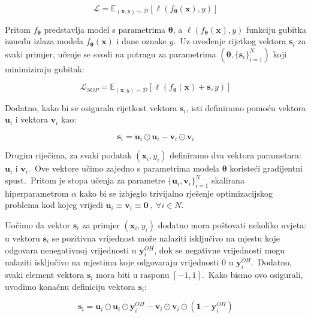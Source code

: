 \documentclass[diplomskirad]{fer}
\begin{document}
\begin{equation}
  \mathcal{L} = \mathbb{E}_{(\bm{x}, y) \sim \mathcal{D}} \left[ \ell(f_{\bm{\theta}}(\bm{x}), y) \right]
  \label{eq:sop1}
\end{equation}

Pritom $f_{\bm{\theta}}$ predstavlja model s parametrima $\bm{\theta}$, a $\ell(f_{\bm{\theta}}(\bm{x}), y)$ funkciju gubitka između izlaza modela $f_{\bm{\theta}}(\bm{x})$ i dane oznake $y$.\ 
Uz uvođenje rijetkog vektora $\bm{s}_i$ za svaki primjer, učenje se svodi na potragu za parametrima $(\bm{\theta}, \{\bm{s}_i\}_{i=1}^N)$ koji minimiziraju gubitak:

\begin{equation}
  \mathcal{L}_{SOP} = \mathbb{E}_{(\bm{x}, y) \sim \mathcal{D}} \left[ \ell(f_{\bm{\theta}}(\bm{x}) + \bm{s}, y) \right]
  \label{eq:sop2}
\end{equation}

Dodatno, kako bi se osigurala rijetkost vektora $\bm{s}_i$, isti definiramo pomoću vektora $\bm{u}_i$ i vektora $\bm{v}_i$ kao:

\begin{equation}
  \bm{s}_i = \bm{u}_i \odot \bm{u}_i - \bm{v}_i \odot \bm{v}_i
  \label{eq:sop_s1}
\end{equation}

Drugim riječima, za svaki podatak $(\bm{x}_i, y_i)$ definiramo dva vektora parametara: $\bm{u}_i$ i $\bm{v}_i$.\ 
Ove vektore učimo zajedno s parametrima modela $\bm{\theta}$ koristeći gradijentni spust.\ 
Pritom je stopa učenja za parametre $\{\bm{u}_i,\bm{v}_i\}_{i=1}^N$ skalirana hiperparametrom $\alpha$ kako bi se izbjeglo trivijalno rješenje optimizacijskog problema kod kojeg vrijedi $\bm{u}_i \equiv \bm{v}_i \equiv \bm{0}\:,\:\forall i \in N$.\ 

Uočimo da vektor $\bm{s}_i$ za primjer $(\bm{x}_i, y_i)$ dodatno mora poštovati nekoliko uvjeta: u vektoru $\bm{s}_i$ se pozitivna vrijednost može nalaziti isključivo na mjestu koje odgovara nenegativnoj vrijednosti u $\bm{y}_i^{OH}$, dok se negativne vrijednosti mogu nalaziti isključivo na mjestima koje odgovaraju vrijednosti $0$ u $\bm{y}_i^{OH}$.\ 
Dodatno, svaki element vektora $\bm{s}_i$ mora biti u rasponu $\left[ -1, 1 \right]$.\ Kako bismo ovo osigurali, uvodimo konačnu definiciju vektora $\bm{s}_i$:

\begin{equation}
  \bm{s}_i = \bm{u}_i \odot \bm{u}_i \odot \bm{y}_i^{OH} - \bm{v}_i \odot \bm{v}_i \odot (\bm{1} - \bm{y}_i^{OH})
  \label{eq:sop_s2}
\end{equation}
\end{document}
